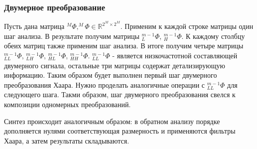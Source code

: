 \documentclass{article}
\begin{document}
\subsubsection{Двумерное преобразование}
Пусть дана матрица $^{M}\Phi, ^{M}\Phi \in \mathbb{R}^{2^{M}\times2^{M}}$. Применим к каждой строке матрицы один шаг анализа. В результате получим матрицы $_L^{m-1}\Phi$, $_H^{m-1}\Phi$. К каждому столбцу обеих матриц также применим шаг анализа. В итоге получим четыре матрицы $_{LL}^{m-1}\Phi$, $_{LH}^{m-1}\Phi$, $_{HL}^{m-1}\Phi$, $_{HH}^{m-1}\Phi$. $_{LL}^{m-1}\Phi$ - является низкочастотной составляющей двумерного сигнала, остальные три матрицы содержат детализирующую информацию. Таким образом будет выполнен первый шаг двумерного преобразования Хаара. Нужно проделать аналогичные операции с $_{LL}^{m-1}\Phi$ для следующего шага. Такми образом, шаг двумерного преобразования свелся к композиции одномерных преобразований.

Синтез происходит аналогичным образом: в обратном анализу порядке дополняется нулями соответствующая размерность и применяются фильтры Хаара, а затем результаты складываются.
\end{document}

